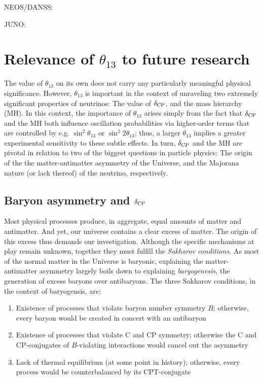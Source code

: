 \documentclass[../thesis.tex]{subfiles}
\begin{document}
NEOS/DANSS:

JUNO:

\section{Relevance of $\theta_{13}$ to future research}
\label{sec:futureRelevance}

The value of $\theta_{13}$ on its own does not carry any particularly meaningful physical significance. However, $\theta_{13}$ is important in the context of unraveling two extremely significant properties of neutrinos: The value of $\delta_\text{CP}$, and the mass hierarchy (MH). In this context, the importance of $\theta_{13}$ arises simply from the fact that $\delta_\text{CP}$ and the MH both influence oscillation probabilities via higher-order terms that are controlled by e.g. \(\sin^2\theta_{13}\) or \(\sin^2 2\theta_{13}\); thus, a larger $\theta_{13}$ implies a greater experimental sensitivity to these subtle effects. In turn, $\delta_\text{CP}$ and the MH are pivotal in relation to two of the biggest questions in particle physics: The origin of the the matter-antimatter asymmetry of the Universe, and the Majorana nature (or lack thereof) of the neutrino, respectively.

\subsection{Baryon asymmetry and $\delta_\text{CP}$}
\label{sec:baryonAsym}

Most physical processes produce, in aggregate, equal amounts of matter and antimatter. And yet, our universe contains a clear excess of matter. The origin of this excess thus demands our investigation. Although the specific mechanisms at play remain unknown, together they must fulfill the \emph{Sakharov conditions.} As most of the normal matter in the Universe is baryonic, explaining the matter-antimatter asymmetry largely boils down to explaining \emph{baryogenesis,} the generation of excess baryons over antibaryons. The three Sakharov conditions, in the context of baryogensis, are:

\begin{enumerate}
\item Existence of processes that violate baryon number symmetry $B$; otherwise, every baryon would be created in concert with an antibaryon
\item Existence of processes that violate C and CP symmetry; otherwise the C and CP-conjugates of $B$-violating interactions would cancel out the asymmetry
\item Lack of thermal equilibrium (at some point in history); otherwise, every process would be counterbalanced by its CPT-conjugate
\end{enumerate}
\end{document}
